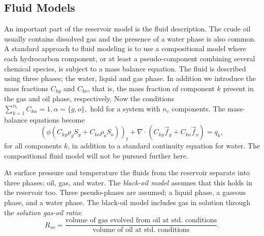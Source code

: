 \subsection{Fluid Models}
\label{section:fluid_models}
An important part of the reservoir model is the fluid description. The crude oil usually contains dissolved gas and the presence of a water phase is also common. A standard approach to fluid modeling is to use a compositional model where each hydrocarbon component, or at least a pseudo-component combining several chemical species, is subject to a mass balance equation. The fluid is described using three phases; the water, liquid and gas phase. In addition we introduce the mass fractions $C_{kg}$ and $C_{ko}$, that is, the mass fraction of component $k$ present in the gas and oil phase, respectively. Now the conditions $\sum_{k=1}^{n_c} C_{k \alpha} = 1, \alpha = \{g,o\},$ hold for a system with $n_c$ components. The mass-balance equations become
\begin{equation*}
( \phi (C_{kg} \rho_g S_g + C_{ko} \rho_o S_o) )_t + \nabla \cdot (C_{kg} \vec{f}_g + C_{ko} \vec{f}_o) = q_k,
\end{equation*}
for all components $k$, in addition to a standard continuity equation for water. The compositional fluid model will not be pursued further here.

At surface pressure and temperature the fluids from the reservoir separate into three phases; oil, gas, and water. The \emph{black-oil model} assumes that this holds in the reservoir too. Three pseudo-phases are assumed; a liquid phase, a gaseous phase, and a water phase. The black-oil model includes gas in solution through the \emph{solution gas-oil ratio}:
\begin{equation*}
R_{so} = \frac{\text{volume of gas evolved from oil at std. conditions}}{\text{volume of oil at std. conditions}}. 
\end{equation*}

